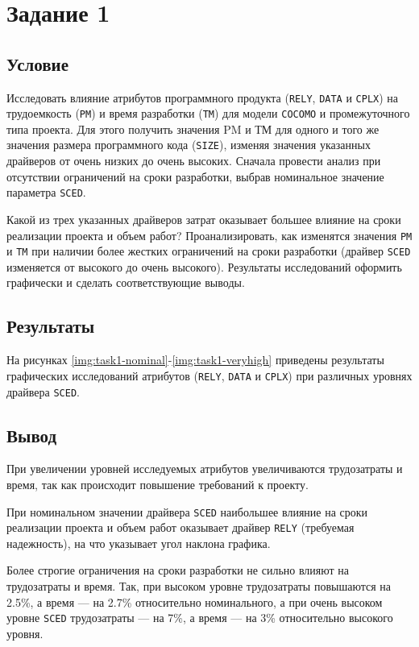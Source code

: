 \section{Задание 1}

\subsection{Условие}

Исследовать влияние атрибутов программного продукта (\texttt{RELY},
\texttt{DATA} и \texttt{CPLX}) на трудоемкость (\texttt{РМ}) и время разработки
(\texttt{ТМ}) для модели \texttt{COCOMO} и промежуточного типа проекта. Для
этого получить значения PM и ТМ для одного и того же значения размера
программного кода (\texttt{SIZE}), изменяя значения указанных драйверов от очень
низких до очень высоких. Сначала провести анализ при отсутствии ограничений на
сроки разработки, выбрав номинальное значение параметра \texttt{SCED}. 

Какой из трех указанных драйверов затрат оказывает большее влияние на сроки
реализации проекта и объем работ? Проанализировать, как изменятся значения
\texttt{PM} и \texttt{ТМ} при наличии более жестких ограничений на сроки
разработки (драйвер \texttt{SCED} изменяется от высокого до очень высокого).
Результаты исследований оформить графически и сделать соответствующие выводы.

\subsection{Результаты}

На рисунках \ref{img:task1-nominal}-\ref{img:task1-veryhigh} приведены
результаты графических исследований атрибутов (\texttt{RELY}, \texttt{DATA} и
\texttt{CPLX}) при различных уровнях драйвера \texttt{SCED}.




\subsection{Вывод}

При увеличении уровней исследуемых атрибутов увеличиваются трудозатраты и время,
так как происходит повышение требований к проекту.

При номинальном значении драйвера \texttt{SCED} наибольшее влияние на сроки
реализации проекта и объем работ оказывает драйвер \texttt{RELY} (требуемая
надежность), на что указывает угол наклона графика.

Более строгие ограничения на сроки разработки не сильно влияют на трудозатраты и
время. Так, при высоком уровне трудозатраты повышаются на 2.5\%, а время --- на
2.7\% относительно номинального, а при очень высоком уровне \texttt{SCED}
трудозатраты --- на 7\%, а время --- на 3\% относительно высокого уровня.
